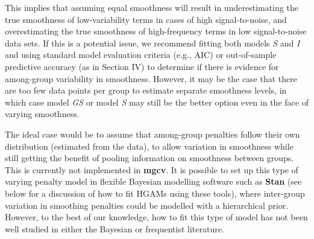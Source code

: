 \documentclass[12pt]{article}
\begin{document}
This implies that assuming equal smoothness will result in
underestimating the true smoothness of low-variability terms in cases of
high signal-to-noise, and overestimating the true smoothness of
high-frequency terms in low signal-to-noise data sets. If this is a
potential issue, we recommend fitting both models \emph{S} and \emph{I}
and using standard model evaluation criteria (e.g., AIC) or
out-of-sample predictive accuracy (as in Section IV) to determine if
there is evidence for among-group variability in smoothness. However, it
may be the case that there are too few data points per group to estimate
separate smoothness levels, in which case model \emph{GS} or model
\emph{S} may still be the better option even in the face of varying
smoothness.

The ideal case would be to assume that among-group penalties follow
their own distribution (estimated from the data), to allow variation in
smoothness while still getting the benefit of pooling information on
smoothness between groups. This is currently not implemented in
\textbf{mgcv}. It is possible to set up this type of varying penalty
model in flexible Bayesian modelling software such as \textbf{Stan} (see
below for a discussion of how to fit HGAMs using these tools), where
inter-group variation in smoothing penalties could be modelled with a
hierarchical prior. However, to the best of our knowledge, how to fit
this type of model has not been well studied in either the Bayesian or
frequentist literature.
\end{document}
